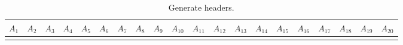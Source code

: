 \documentclass[12pt]{article}
\begin{document}
\begin{table}[t]
\scriptsize
\begin{center}
\begin{tabular}{ l|l|l|l|l|l|l|l|l|l|l|l|l|l|l|l|l|l|l|l| }
$A_{1}$ & $A_{2}$ & $A_{3}$ & $A_{4}$ & $A_{5}$ & $A_{6}$ & $A_{7}$ & $A_{8}$ & $A_{9}$ & $A_{10}$ & $A_{11}$ & $A_{12}$ & $A_{13}$ & $A_{14}$ & $A_{15}$ & $A_{16}$ & $A_{17}$ & $A_{18}$ & $A_{19}$ & $A_{20}$ \\ \toprule
 & & & & & & & & & & & & & & & & & & & \\ \midrule
\end{tabular}
\caption{Generate headers.}\label{tab:generate-headers}
\end{center}
\end{table}
\end{document}
